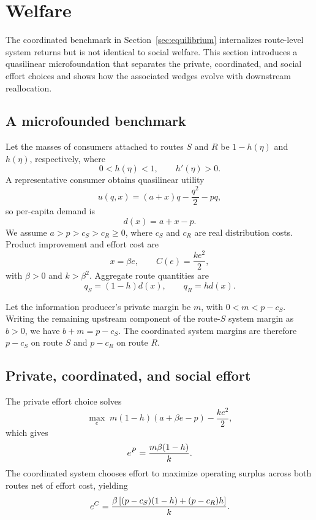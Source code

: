 \section{Welfare}\label{sec:welfare}

The coordinated benchmark in Section~\ref{sec:equilibrium} internalizes route-level system returns but is not identical to social welfare. This section introduces a quasilinear microfoundation that separates the private, coordinated, and social effort choices and shows how the associated wedges evolve with downstream reallocation.

\subsection{A microfounded benchmark}

Let the masses of consumers attached to routes $S$ and $R$ be $1-h(\eta)$ and $h(\eta)$, respectively, where
\[
    0<h(\eta)<1, \qquad h'(\eta)>0.
\]
A representative consumer obtains quasilinear utility
\begin{equation}
    u(q,x)=(a+x)q-\frac{q^2}{2}-pq,
    \label{eq:utility}
\end{equation}
so per-capita demand is
\begin{equation}
    d(x)=a+x-p.
    \label{eq:demand}
\end{equation}
We assume $a>p>c_S>c_R\geq0$, where $c_S$ and $c_R$ are real distribution costs. Product improvement and effort cost are
\[
    x=\beta e, \qquad C(e)=\frac{k e^2}{2},
\]
with $\beta>0$ and $k>\beta^2$. Aggregate route quantities are
\[
    q_S=(1-h)d(x), \qquad q_R=h d(x).
\]

Let the information producer's private margin be $m$, with $0<m<p-c_S$. Writing the remaining upstream component of the route-$S$ system margin as $b>0$, we have $b+m=p-c_S$. The coordinated system margins are therefore $p-c_S$ on route $S$ and $p-c_R$ on route $R$.

\subsection{Private, coordinated, and social effort}

The private effort choice solves
\[
    \max_e\; m(1-h)(a+\beta e-p)-\frac{k e^2}{2},
\]
which gives
\begin{equation}
    e^{P}=\frac{m\beta(1-h)}{k}.
    \label{eq:ep}
\end{equation}
The coordinated system chooses effort to maximize operating surplus across both routes net of effort cost, yielding
\begin{equation}
    e^{C}
    =\frac{\beta\left[(p-c_S)(1-h)+(p-c_R)h\right]}{k}.
    \label{eq:ec}
\end{equation}

